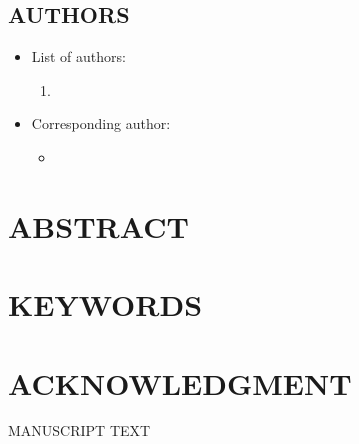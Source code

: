 \documentclass[12pt,english]{article}
\begin{document}
\subsection*{AUTHORS}
\begin{itemize}[label={}, leftmargin=*]
    \item List of authors:
    \begin{enumerate}
        \item \AUTHORWANG
    \end{enumerate}
    \item Corresponding author:
    \begin{itemize}
        \item \textbf{\AUTHORWANG}
    \end{itemize}
\end{itemize}
\clearpage 

\doublespacing
\section*{ABSTRACT}
\PAPERABSTRACT
\clearpage 

\doublespacing
\section*{KEYWORDS}
\PAPERKEYWORDS
\clearpage 

\doublespacing
\section*{ACKNOWLEDGMENT}
\ACKNOWLEDGMENTS
\clearpage 

\setcounter{page}{1}
\renewcommand*{\thefootnote}{\arabic{footnote}}
\begingroup
  \centering
  \Large MANUSCRIPT TEXT\\[1em]
\endgroup


\begingroup
{}
\setlength\bibitemsep{0pt}
\printbibliography[title=References for Manuscript]
\endgroup
\pagebreak



\appendix
\begin{refsection}

\end{refsection}
\end{document}
